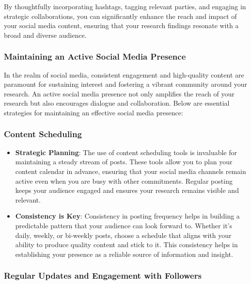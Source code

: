 \documentclass[
]{book}
\begin{document}
By thoughtfully incorporating hashtags, tagging relevant parties, and engaging in strategic collaborations, you can significantly enhance the reach and impact of your social media content, ensuring that your research findings resonate with a broad and diverse audience.

\hypertarget{maintaining-an-active-social-media-presence}{%
\subsubsection*{Maintaining an Active Social Media Presence}\label{maintaining-an-active-social-media-presence}}

In the realm of social media, consistent engagement and high-quality content are paramount for sustaining interest and fostering a vibrant community around your research. An active social media presence not only amplifies the reach of your research but also encourages dialogue and collaboration. Below are essential strategies for maintaining an effective social media presence:

\hypertarget{content-scheduling}{%
\subsubsection*{Content Scheduling}\label{content-scheduling}}

\begin{itemize}
\item
  \textbf{Strategic Planning}: The use of content scheduling tools is invaluable for maintaining a steady stream of posts. These tools allow you to plan your content calendar in advance, ensuring that your social media channels remain active even when you are busy with other commitments. Regular posting keeps your audience engaged and ensures your research remains visible and relevant.
\item
  \textbf{Consistency is Key}: Consistency in posting frequency helps in building a predictable pattern that your audience can look forward to. Whether it's daily, weekly, or bi-weekly posts, choose a schedule that aligns with your ability to produce quality content and stick to it. This consistency helps in establishing your presence as a reliable source of information and insight.
\end{itemize}

\hypertarget{regular-updates-and-engagement-with-followers}{%
\subsubsection*{Regular Updates and Engagement with Followers}\label{regular-updates-and-engagement-with-followers}}
\end{document}
